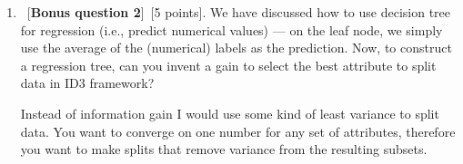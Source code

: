 \documentclass[12pt, fullpage,letterpaper]{article}
\begin{document}
\begin{enumerate}
\item ~[\textbf{Bonus question 2}]~[5 points].  We have discussed how to use decision tree for regression (i.e., predict numerical values) --- on the leaf node, we simply use the average of the (numerical) labels as the prediction.  Now, to construct a regression tree, can you invent a gain to select the best attribute to split data in ID3 framework?

\begin{framed}
	  \newline
	Instead of information gain I would use some kind of least variance to split data. You want to converge on one number for any set of attributes, therefore you want to make splits that remove variance from the resulting subsets. 
	
\end{framed}

\end{enumerate}
\end{document}
